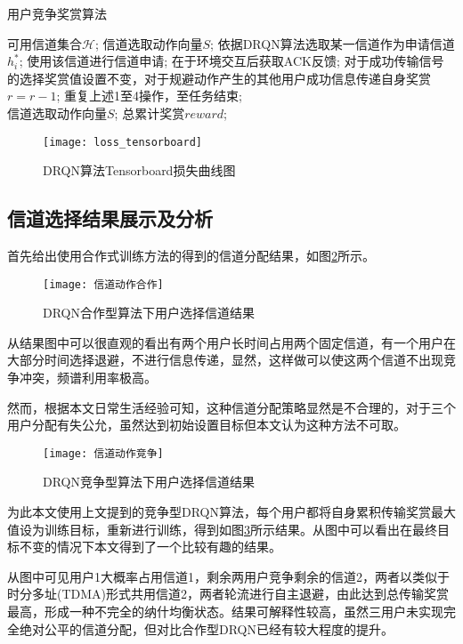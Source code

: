 \begin{algorithm}[htb]  
	\caption{用户竞争奖赏算法}  
	\label{alg:headstate}  
	\begin{algorithmic}[1]  
		\Require  
		可用信道集合$\mathcal{H}$; 
		\Ensure  
		信道选取动作向量$S$;  
		\State 依据DRQN算法选取某一信道作为申请信道$h_{i}^{*}$;
		\State 使用该信道进行信道申请;				
		\State 在于环境交互后获取ACK反馈;  
		\State 对于成功传输信号的选择奖赏值设置不变，对于规避动作产生的其他用户成功信息传递自身奖赏$r=r-1$;
		\State 重复上述1至4操作，至任务结束; \\
		\Return 信道选取动作向量$S$; 总累计奖赏$reward$; 
	\end{algorithmic}  
\end{algorithm}  


\begin{figure}[htbp]
	\centering
	\texttt{[image: loss\_tensorboard]}
	\caption{DRQN算法Tensorboard损失曲线图}
	\label{fig:loss_tensorboard}
\end{figure}
\subsection{信道选择结果展示及分析}
首先给出使用合作式训练方法的得到的信道分配结果，如图\ref{fig:信道动作合作}所示。
\begin{figure}[htbp]
	\centering
	\texttt{[image: 信道动作合作]}
	\caption{DRQN合作型算法下用户选择信道结果}
	\label{fig:信道动作合作}
\end{figure}

从结果图中可以很直观的看出有两个用户长时间占用两个固定信道，有一个用户在大部分时间选择退避，不进行信息传递，显然，这样做可以使这两个信道不出现竞争冲突，频谱利用率极高。

然而，根据本文日常生活经验可知，这种信道分配策略显然是不合理的，对于三个用户分配有失公允，虽然达到初始设置目标但本文认为这种方法不可取。
\begin{figure}[htbp]
	\centering
	\texttt{[image: 信道动作竞争]}
	\caption{DRQN竞争型算法下用户选择信道结果}
	\label{fig:信道动作竞争}
\end{figure}

为此本文使用上文提到的竞争型DRQN算法，每个用户都将自身累积传输奖赏最大值设为训练目标，重新进行训练，得到如图\ref{fig:信道动作竞争}所示结果。从图中可以看出在最终目标不变的情况下本文得到了一个比较有趣的结果。

从图中可见用户1大概率占用信道1，剩余两用户竞争剩余的信道2，两者以类似于时分多址(TDMA)形式共用信道2，两者轮流进行自主退避，由此达到总传输奖赏最高，形成一种不完全的纳什均衡状态。结果可解释性较高，虽然三用户未实现完全绝对公平的信道分配，但对比合作型DRQN已经有较大程度的提升。

